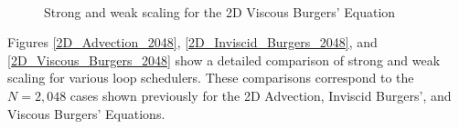 \documentclass{article}
\begin{document}
\begin{figure}[p]
\vspace{-25mm}
\centering
\captionsetup[subfigure]{labelformat=empty}
\\
\vfill
{}
\caption{Strong and weak scaling for the 2D Viscous Burgers' Equation} 
\label{2D_Viscous_Burgers_Strong_Weak}
\end{figure}

Figures \ref{2D_Advection_2048}, \ref{2D_Inviscid_Burgers_2048}, and \ref{2D_Viscous_Burgers_2048} show a detailed comparison of strong and weak scaling for various loop schedulers. These comparisons correspond to the $N = 2,048$ cases shown previously for the 2D Advection, Inviscid Burgers', and Viscous Burgers' Equations.
\end{document}
